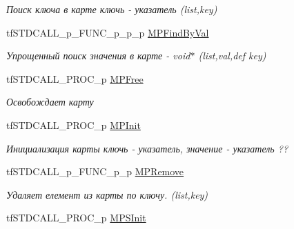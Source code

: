 \begin{DoxyCompactItemize}
\begin{DoxyCompactList}\small\item\em Поиск ключа в карте ключь -\/ указатель (list,key) \end{DoxyCompactList}\item 
\hypertarget{structs_functions_array_c_p_u_a50766cb51ee36b418f7a1d631943eeb7}{tf\-S\-T\-D\-C\-A\-L\-L\-\_\-p\-\_\-\-F\-U\-N\-C\-\_\-p\-\_\-p\-\_\-p \hyperlink{structs_functions_array_c_p_u_a50766cb51ee36b418f7a1d631943eeb7}{M\-P\-Find\-By\-Val}}\label{structs_functions_array_c_p_u_a50766cb51ee36b418f7a1d631943eeb7}

\begin{DoxyCompactList}\small\item\em Упрощенный поиск значения в карте -\/ void$\ast$ (list,val,def key) \end{DoxyCompactList}\item 
\hypertarget{structs_functions_array_c_p_u_a802d43c367bad7f29e98b1a2e179eafe}{tf\-S\-T\-D\-C\-A\-L\-L\-\_\-\-P\-R\-O\-C\-\_\-p \hyperlink{structs_functions_array_c_p_u_a802d43c367bad7f29e98b1a2e179eafe}{M\-P\-Free}}\label{structs_functions_array_c_p_u_a802d43c367bad7f29e98b1a2e179eafe}

\begin{DoxyCompactList}\small\item\em Освобождает карту \end{DoxyCompactList}\item 
\hypertarget{structs_functions_array_c_p_u_a2b267719df4d3c1f3c331fe3e193a6b9}{tf\-S\-T\-D\-C\-A\-L\-L\-\_\-\-P\-R\-O\-C\-\_\-p \hyperlink{structs_functions_array_c_p_u_a2b267719df4d3c1f3c331fe3e193a6b9}{M\-P\-Init}}\label{structs_functions_array_c_p_u_a2b267719df4d3c1f3c331fe3e193a6b9}

\begin{DoxyCompactList}\small\item\em Инициализация карты ключь -\/ указатель, значение -\/ указатель ?? \end{DoxyCompactList}\item 
\hypertarget{structs_functions_array_c_p_u_a2e924befbf616370f2a37f0974b212b6}{tf\-S\-T\-D\-C\-A\-L\-L\-\_\-p\-\_\-\-F\-U\-N\-C\-\_\-p\-\_\-p \hyperlink{structs_functions_array_c_p_u_a2e924befbf616370f2a37f0974b212b6}{M\-P\-Remove}}\label{structs_functions_array_c_p_u_a2e924befbf616370f2a37f0974b212b6}

\begin{DoxyCompactList}\small\item\em Удаляет елемент из карты по ключу. (list,key) \end{DoxyCompactList}\item 
\hypertarget{structs_functions_array_c_p_u_a254c62f54ada80e40033bf2e377b0436}{tf\-S\-T\-D\-C\-A\-L\-L\-\_\-\-P\-R\-O\-C\-\_\-p \hyperlink{structs_functions_array_c_p_u_a254c62f54ada80e40033bf2e377b0436}{M\-P\-S\-Init}}\label{structs_functions_array_c_p_u_a254c62f54ada80e40033bf2e377b0436}


\end{DoxyCompactItemize}
